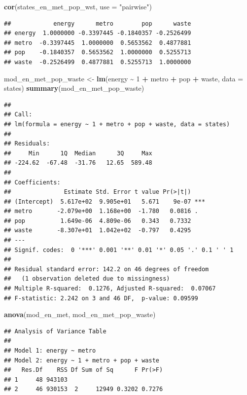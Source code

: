\documentclass[
]{book}
\newenvironment{Shaded}{\begin{snugshade}}{\end{snugshade}}
\newcommand{\DataTypeTok}[1]{\textcolor[rgb]{0.13,0.29,0.53}{#1}}
\newcommand{\DecValTok}[1]{\textcolor[rgb]{0.00,0.00,0.81}{#1}}
\newcommand{\KeywordTok}[1]{\textcolor[rgb]{0.13,0.29,0.53}{\textbf{#1}}}
\newcommand{\NormalTok}[1]{#1}
\newcommand{\OperatorTok}[1]{\textcolor[rgb]{0.81,0.36,0.00}{\textbf{#1}}}
\newcommand{\StringTok}[1]{\textcolor[rgb]{0.31,0.60,0.02}{#1}}
\begin{document}
\begin{alert}
\begin{Shaded}
\begin{Highlighting}[]
  \KeywordTok{cor}\NormalTok{(states\_en\_met\_pop\_wst, }\DataTypeTok{use =} \StringTok{"pairwise"}\NormalTok{)}
\end{Highlighting}
\end{Shaded}

\begin{verbatim}
##            energy      metro        pop      waste
## energy  1.0000000 -0.3397445 -0.1840357 -0.2526499
## metro  -0.3397445  1.0000000  0.5653562  0.4877881
## pop    -0.1840357  0.5653562  1.0000000  0.5255713
## waste  -0.2526499  0.4877881  0.5255713  1.0000000
\end{verbatim}

\begin{Shaded}
\begin{Highlighting}[]
\NormalTok{  mod\_en\_met\_pop\_waste \textless{}{-}}\StringTok{ }\KeywordTok{lm}\NormalTok{(energy }\OperatorTok{\textasciitilde{}}\StringTok{ }\DecValTok{1} \OperatorTok{+}\StringTok{ }\NormalTok{metro }\OperatorTok{+}\StringTok{ }\NormalTok{pop }\OperatorTok{+}\StringTok{ }\NormalTok{waste, }\DataTypeTok{data =}\NormalTok{ states)}
  \KeywordTok{summary}\NormalTok{(mod\_en\_met\_pop\_waste)}
\end{Highlighting}
\end{Shaded}

\begin{verbatim}
## 
## Call:
## lm(formula = energy ~ 1 + metro + pop + waste, data = states)
## 
## Residuals:
##     Min      1Q  Median      3Q     Max 
## -224.62  -67.48  -31.76   12.65  589.48 
## 
## Coefficients:
##               Estimate Std. Error t value Pr(>|t|)    
## (Intercept)  5.617e+02  9.905e+01   5.671    9e-07 ***
## metro       -2.079e+00  1.168e+00  -1.780   0.0816 .  
## pop          1.649e-06  4.809e-06   0.343   0.7332    
## waste       -8.307e+01  1.042e+02  -0.797   0.4295    
## ---
## Signif. codes:  0 '***' 0.001 '**' 0.01 '*' 0.05 '.' 0.1 ' ' 1
## 
## Residual standard error: 142.2 on 46 degrees of freedom
##   (1 observation deleted due to missingness)
## Multiple R-squared:  0.1276, Adjusted R-squared:  0.07067 
## F-statistic: 2.242 on 3 and 46 DF,  p-value: 0.09599
\end{verbatim}

\begin{Shaded}
\begin{Highlighting}[]
  \KeywordTok{anova}\NormalTok{(mod\_en\_met, mod\_en\_met\_pop\_waste)}
\end{Highlighting}
\end{Shaded}

\begin{verbatim}
## Analysis of Variance Table
## 
## Model 1: energy ~ metro
## Model 2: energy ~ 1 + metro + pop + waste
##   Res.Df    RSS Df Sum of Sq      F Pr(>F)
## 1     48 943103                           
## 2     46 930153  2     12949 0.3202 0.7276
\end{verbatim}

\end{alert}
\end{document}
